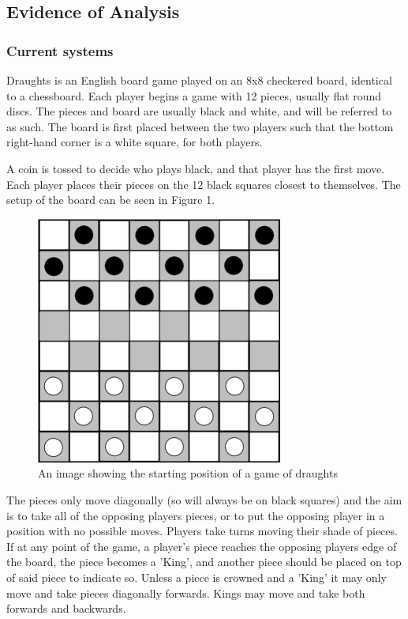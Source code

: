 \documentclass{article}
\makeatletter
\newcommand\subsubsubsection{\@startsection{paragraph}{4}{\z@}{-2.5ex\@plus -1ex \@minus -.25ex}{1.25ex \@plus .25ex}{\normalfont\normalsize\bfseries}}
\makeatother
\begin{document}
    \subsection{Evidence of Analysis}

    \subsubsection{Current systems}

    \subsubsubsection{Draughts}
    Draughts is an English board game played on an 8x8 checkered board, identical to a chessboard.
    Each player begins a game with 12 pieces, usually flat round discs.
    The pieces and board are usually black and white, and will be referred to as such.
    The board is first placed between the two players such that the bottom right-hand corner is a white square,
    for both players.
    
    A coin is tossed to decide who plays black, and that player has the first move. Each player places their pieces
    on the 12 black squares closest to themselves. The setup of the board can be seen in Figure 1. 

    \begin{figure}
        \centering
        \includegraphics[scale=0.35]{The-starting-position-for-checkers.png}
        \caption{An image showing the starting position of a game of draughts}
    \end{figure}
    The pieces only move diagonally (so will always be on black squares)
    and the aim is to take all of the opposing players pieces, or to put the opposing player in a position with no possible moves.
    Players take turns moving their shade of pieces. If at any point of the game, a player's piece reaches the opposing players edge
    of the board, the piece becomes a 'King', and another piece should be placed on top of said piece to indicate so.
    Unless a piece is crowned and a 'King' it may only move and take pieces diagonally forwards. Kings may move and take both forwards and backwards.
    
\end{document}
